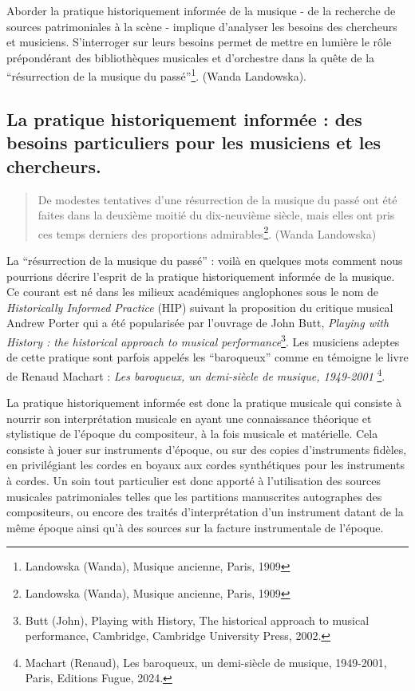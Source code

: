 Aborder la pratique historiquement informée de la musique - de la recherche de sources patrimoniales à la scène - implique d'analyser les besoins des chercheurs et musiciens. S'interroger sur leurs besoins permet de mettre en lumière le rôle prépondérant des bibliothèques musicales et d'orchestre dans la quête de la \enquote{résurrection de la musique du passé}\footnote{Landowska (Wanda), Musique ancienne, Paris, 1909}. (Wanda Landowska).

\subsection*{La pratique historiquement informée : des besoins particuliers pour les musiciens et les chercheurs.}

\begin{quote}
	De modestes tentatives d'une résurrection de la musique du passé ont été faites dans la deuxième moitié du dix-neuvième siècle, mais elles ont pris ces temps derniers des proportions admirables\footnote{Landowska (Wanda), Musique ancienne, Paris, 1909}. (Wanda Landowska)
\end{quote}

La \enquote{résurrection de la musique du passé} : voilà en quelques mots comment nous pourrions décrire l'esprit de la pratique historiquement informée de la musique. Ce courant est né dans les milieux académiques anglophones sous le nom de \textit{Historically Informed Practice} (HIP) suivant la proposition du critique musical Andrew Porter qui a été popularisée par l'ouvrage de John Butt, \textit{Playing with History : the historical approach to musical performance}\footnote{Butt (John), Playing with History, The historical approach to musical performance, Cambridge, Cambridge University Press, 2002.}. 
Les musiciens adeptes de cette pratique sont parfois appelés les \enquote{baroqueux} comme en témoigne le livre de Renaud Machart : \textit{Les baroqueux, un demi-siècle de musique, 1949-2001} \footnote{Machart (Renaud), Les baroqueux, un demi-siècle de musique, 1949-2001, Paris, Editions Fugue, 2024.}. 

La pratique historiquement informée est donc la pratique musicale qui consiste à nourrir son interprétation musicale en ayant une connaissance théorique et stylistique de l'époque du compositeur, à la fois musicale et matérielle. Cela consiste à jouer sur instruments d'époque, ou sur des copies d'instruments fidèles, en privilégiant les cordes en boyaux aux cordes synthétiques pour les instruments à cordes. Un soin tout particulier est donc apporté à l'utilisation des sources musicales patrimoniales telles que les partitions manuscrites autographes des compositeurs, ou encore des traités d'interprétation d'un instrument datant de la même époque ainsi qu'à des sources sur la facture instrumentale de l'époque.

